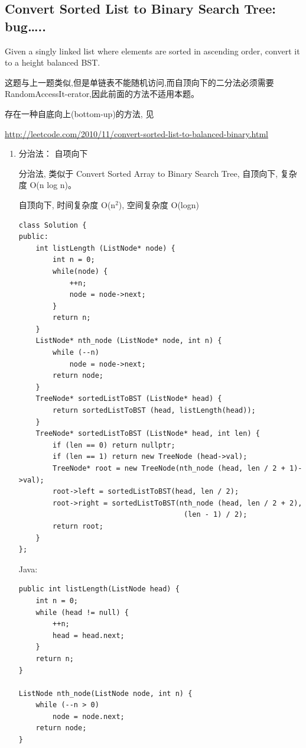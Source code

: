 \documentclass[12pt]{book}
\begin{document}
\subsection{Convert Sorted List to Binary Search Tree: bug\ldots{}..}
\label{sec-4-4-3}
Given a singly linked list where elements are sorted in ascending order, convert it to a height balanced BST.

这题与上一题类似,但是单链表不能随机访问,而自顶向下的二分法必须需要 RandomAccessIt-erator,因此前面的方法不适用本题。

存在一种自底向上(bottom-up)的方法, 见 

\url{http://leetcode.com/2010/11/convert-sorted-list-to-balanced-binary.html}

\begin{enumerate}
\item 分治法： 自项向下
\label{sec-4-4-3-1}

分治法, 类似于 Convert Sorted Array to Binary Search Tree, 自顶向下, 复杂度 O(n log n)。

自顶向下, 时间复杂度 O(n$^{\text{2}}$), 空间复杂度 O(logn)

\lstset{language=java,label= ,caption= ,numbers=none}
\begin{lstlisting}
class Solution {
public:
    int listLength (ListNode* node) {
        int n = 0;
        while(node) {
            ++n;
            node = node->next;
        }
        return n;
    }
    ListNode* nth_node (ListNode* node, int n) {
        while (--n)
            node = node->next;
        return node;
    }
    TreeNode* sortedListToBST (ListNode* head) {
        return sortedListToBST (head, listLength(head));
    }
    TreeNode* sortedListToBST (ListNode* head, int len) {
        if (len == 0) return nullptr;
        if (len == 1) return new TreeNode (head->val);
        TreeNode* root = new TreeNode(nth_node (head, len / 2 + 1)->val);
        root->left = sortedListToBST(head, len / 2);
        root->right = sortedListToBST(nth_node (head, len / 2 + 2),
                                       (len - 1) / 2);
        return root;
    }
};
\end{lstlisting}

Java: 
\lstset{language=java,label= ,caption= ,numbers=none}
\begin{lstlisting}
public int listLength(ListNode head) {
    int n = 0;
    while (head != null) {
        ++n;
        head = head.next;
    }
    return n;
}

ListNode nth_node(ListNode node, int n) {
    while (--n > 0) 
        node = node.next;
    return node;
}


\end{lstlisting}
\end{enumerate}
\end{document}
